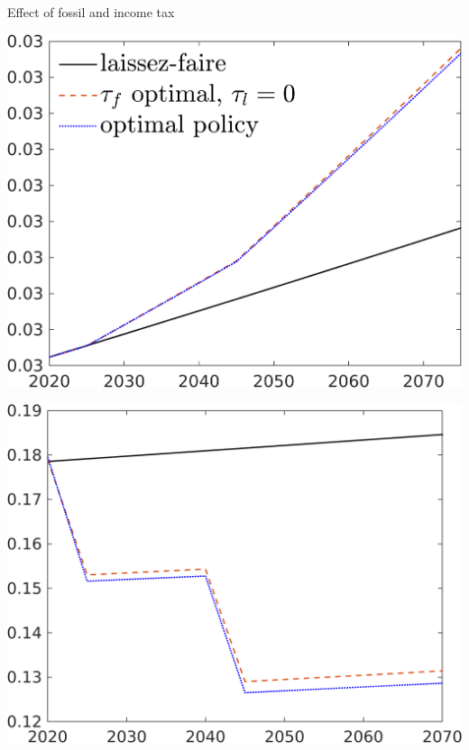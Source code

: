 \documentclass[11pt,aspectratio=169]{beamer}
\begin{document}
\addtocounter{framenumber}{-1}
\begin{frame}{ Effect of fossil and income tax}
	\centering
	\begin{minipage}[]{0.3\textwidth}
		\includegraphics[width=1\textwidth]{../codding_model/own_basedOnFried/optimalPol_elastS_DisuSci/figures/all_1705/CompCounterFac_withLF_taufopt1_taulopt0_AgAf_spillover0_noskill0_sep1_BN0_ineq0_red0_xgrowth0_etaa0.79_lgd1.png}
	\end{minipage}
	\begin{minipage}[]{0.3\textwidth}
		\includegraphics[width=1\textwidth]{../codding_model/own_basedOnFried/optimalPol_elastS_DisuSci/figures/all_1705/CompCounterFac_withLF_taufopt1_taulopt0_gAagg_spillover0_noskill0_sep1_BN0_ineq0_red0_xgrowth0_etaa0.79_lgd0.png}

\end{minipage}
\end{frame}
\end{document}
